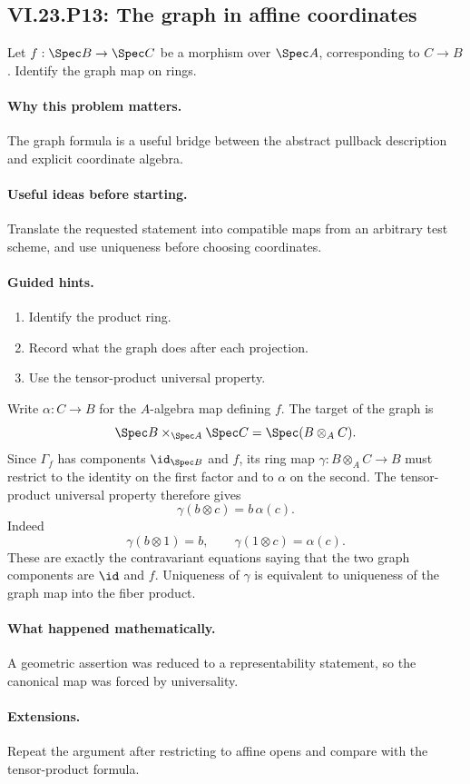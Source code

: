 \subsection*{VI.23.P13: The graph in affine coordinates}
\begin{problem}\label{prob:vi23-p13}
Let $f:\Spec B\to\Spec C$ be a morphism over $\Spec A$, corresponding to $C\to B$.
Identify the graph map on rings.
\end{problem}

\ifdefined\FullProblemDossiers
\paragraph{Why this problem matters.}
The graph formula is a useful bridge between the abstract pullback description and explicit coordinate algebra.

\paragraph{Useful ideas before starting.}
Translate the requested statement into compatible maps from an arbitrary test scheme, and use uniqueness before choosing coordinates.

\paragraph{Guided hints.}
\begin{enumerate}
\item Identify the product ring.
\item Record what the graph does after each projection.
\item Use the tensor-product universal property.
\end{enumerate}

\begin{solution}
Write $\alpha:C\to B$ for the $A$-algebra map defining $f$.  The target of the graph is
\[
\Spec B\times_{\Spec A}\Spec C=\Spec(B\otimes_AC).
\]
Since $\Gamma_f$ has components $\id_{\Spec B}$ and $f$, its ring map
$\gamma:B\otimes_AC\to B$ must restrict to the identity on the first factor and to $\alpha$ on
the second.  The tensor-product universal property therefore gives
\[
\gamma(b\otimes c)=b\,\alpha(c).
\]
Indeed
\[
\gamma(b\otimes1)=b,\qquad \gamma(1\otimes c)=\alpha(c).
\]
These are exactly the contravariant equations saying that the two graph components are
$\id$ and $f$.  Uniqueness of $\gamma$ is equivalent to uniqueness of the graph map into the
fiber product.
\end{solution}

\paragraph{What happened mathematically.}
A geometric assertion was reduced to a representability statement, so the canonical map was forced by universality.

\paragraph{Extensions.}
Repeat the argument after restricting to affine opens and compare with the tensor-product formula.
\fi
